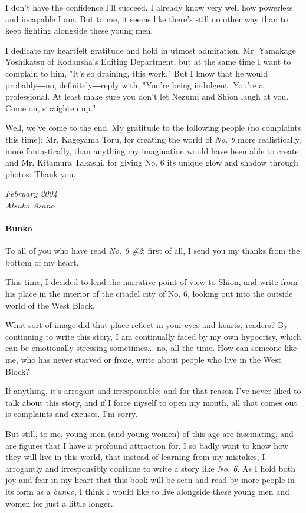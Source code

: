 I don't have the confidence I'll succeed. I already know very well how
powerless and incapable I am. But to me, it seems like there's still no
other way than to keep fighting alongside these young men.

I dedicate my heartfelt gratitude and hold in utmost admiration, Mr.
Yamakage Yoshikatsu of Kodansha's Editing Department, but at the same
time I want to complain to him, "It's so draining, this work." But I
know that he would probably―no, definitely―reply with, "You're being
indulgent. You're a professional. At least make sure you don't let
Nezumi and Shion laugh at you. Come on, straighten up."

Well, we've come to the end. My gratitude to the following people (no
complaints this time): Mr. Kageyama Toru, for creating the world of \emph{No.
6} more realistically, more fantastically, than anything my imagination
would have been able to create; and Mr. Kitamura Takashi, for giving No.
6 its unique glow and shadow through photos. Thank you.

\myspace

\emph{February 2004\\
Atsuko Asano}

\paragraph{Bunko}

To all of you who have read \emph{No. 6 \#2}: first of all, I send you my
thanks from the bottom of my heart.

This time, I decided to lend the narrative point of view to Shion, and
write from his place in the interior of the citadel city of No. 6,
looking out into the outside world of the West Block.

What sort of image did that place reflect in your eyes and hearts,
readers? By continuing to write this story, I am continually faced by my
own hypocrisy, which can be emotionally stressing sometimes... no, all
the time. How can someone like me, who has never starved or froze, write
about people who live in the West Block?

If anything, it's arrogant and irresponsible; and for that reason I've
never liked to talk about this story, and if I force myself to open my
mouth, all that comes out is complaints and excuses. I'm sorry.

But still, to me, young men (and young women) of this age are
fascinating, and are figures that I have a profound attraction for. I so
badly want to know how they will live in this world, that instead of
learning from my mistakes, I arrogantly and irresponsibly continue to
write a story like \emph{No. 6}. As I hold both joy and fear in my heart that
this book will be seen and read by more people in its form as a \emph{bunko}, I
think I would like to live alongside these young men and women for just
a little longer.

